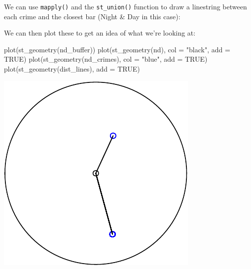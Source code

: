 \documentclass[
]{book}
\newenvironment{Shaded}{\begin{snugshade}}{\end{snugshade}}
\newcommand{\AttributeTok}[1]{\textcolor[rgb]{0.77,0.63,0.00}{#1}}
\newcommand{\ConstantTok}[1]{\textcolor[rgb]{0.00,0.00,0.00}{#1}}
\newcommand{\ControlFlowTok}[1]{\textcolor[rgb]{0.13,0.29,0.53}{\textbf{#1}}}
\newcommand{\FunctionTok}[1]{\textcolor[rgb]{0.00,0.00,0.00}{#1}}
\newcommand{\NormalTok}[1]{#1}
\newcommand{\OtherTok}[1]{\textcolor[rgb]{0.56,0.35,0.01}{#1}}
\newcommand{\SpecialCharTok}[1]{\textcolor[rgb]{0.00,0.00,0.00}{#1}}
\newcommand{\StringTok}[1]{\textcolor[rgb]{0.31,0.60,0.02}{#1}}
\begin{document}
We can use \texttt{mapply()} and the \texttt{st\_union()} function to draw a linestring between each crime and the closest bar (Night \& Day in this case):

\begin{Shaded}
\end{Shaded}

We can then plot these to get an idea of what we're looking at:

\begin{Shaded}
\begin{Highlighting}[]
\FunctionTok{plot}\NormalTok{(}\FunctionTok{st\_geometry}\NormalTok{(nd\_buffer))}
\FunctionTok{plot}\NormalTok{(}\FunctionTok{st\_geometry}\NormalTok{(nd), }\AttributeTok{col =} \StringTok{"black"}\NormalTok{, }\AttributeTok{add =} \ConstantTok{TRUE}\NormalTok{)}
\FunctionTok{plot}\NormalTok{(}\FunctionTok{st\_geometry}\NormalTok{(nd\_crimes), }\AttributeTok{col =} \StringTok{"blue"}\NormalTok{, }\AttributeTok{add =} \ConstantTok{TRUE}\NormalTok{)}
\FunctionTok{plot}\NormalTok{(}\FunctionTok{st\_geometry}\NormalTok{(dist\_lines), }\AttributeTok{add =} \ConstantTok{TRUE}\NormalTok{)}
\end{Highlighting}
\end{Shaded}

\includegraphics{crime_mapping_files/figure-latex/unnamed-chunk-44-1.pdf}
\end{document}

